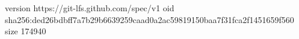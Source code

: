 version https://git-lfs.github.com/spec/v1
oid sha256:ded26bdbff7a7b29b6639259caad0a2ac59819150baa7f31fca2f1451659f560
size 174940
